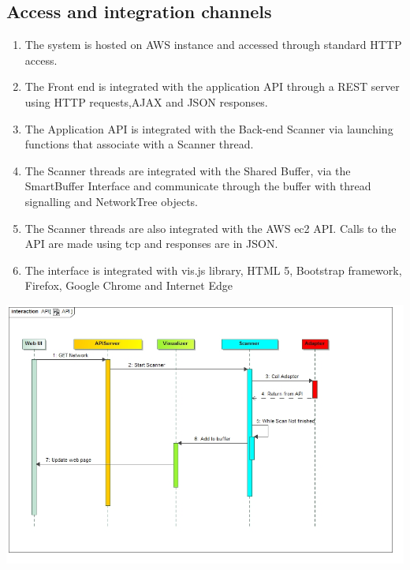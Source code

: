 \documentclass[hidelinks,a4paper,12pt]{article}
\begin{document}
\subsection{Access and integration channels}
\begin{enumerate} 
\item The system is hosted on AWS instance and accessed through standard HTTP access.
\item The Front end is integrated with the application API through a REST server using HTTP requests,AJAX and JSON responses.
\item The Application API is integrated with the Back-end Scanner via launching functions that associate with a Scanner thread. 
\item The Scanner threads are integrated with the Shared Buffer, via the SmartBuffer Interface and communicate through the buffer with thread signalling and NetworkTree objects.
\item The Scanner threads are also integrated with the AWS ec2 API. Calls to the API are made using tcp and responses are in JSON.
\item The interface is integrated with vis.js library, HTML 5, Bootstrap framework, Firefox, Google Chrome and Internet Edge
\end{enumerate}

\includegraphics[width=1.00\textwidth]{./images/API.jpg}\\[0.4cm] 
\end{document}
